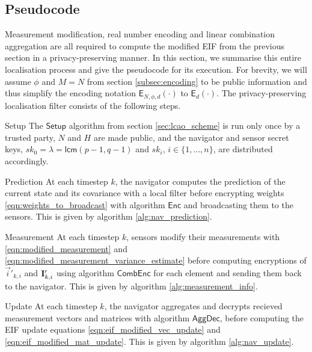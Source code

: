 \documentclass[10pt,letterpaper,oneside,twocolumn,journal]{IEEEtran}
\theoremstyle{definition}
\theoremstyle{definition}
\theoremstyle{remark}
\begin{document}
% 
% 

\subsection{Pseudocode} \label{subsec:pseudocode}
Measurement modification, real number encoding and linear combination aggregation are all required to compute the modified EIF from the previous section in a privacy-preserving manner. In this section, we summarise this entire localisation process and give the pseudocode for its execution. For brevity, we will assume $\phi$ and $M=N$ from section \ref{subsec:encoding} to be public information and thus simplify the encoding notation $\mathsf{E}_{N,\phi,d}(\cdot)$ to $\mathsf{E}_{d}(\cdot)$. The privacy-preserving localisation filter consists of the following steps.
\begin{LaTeXdescription}
    \item[Setup] The $\mathsf{Setup}$ algorithm from section \ref{sec:lcao_scheme} is run only once by a trusted party, $N$ and $H$ are made public, and the navigator and sensor secret keys, $sk_0=\lambda=\mathsf{lcm}(p-1, q-1)$ and $sk_i$, $i\in\{1,\dots,n\}$, are distributed accordingly. 

    \item[Prediction] At each timestep $k$, the navigator computes the prediction of the current state and its covariance with a local filter before encrypting weights \eqref{eqn:weights_to_broadcast} with algorithm $\mathsf{Enc}$ and broadcasting them to the sensors. This is given by algorithm \ref{alg:nav_prediction}.

    \item[Measurement] At each timestep $k$, sensors modify their measurements with \eqref{eqn:modified_measurement} and \eqref{eqn:modified_measurement_variance_estimate} before computing encryptions of $\vec{i}'_{k,i}$ and ${{\mathbf{I}}}'_{k,i}$ using algorithm $\mathsf{CombEnc}$ for each element and sending them back to the navigator. This is given by algorithm \ref{alg:measurement_info}.

    \item[Update] At each timestep $k$, the navigator aggregates and decrypts recieved measurement vectors and matrices with algorithm $\mathsf{AggDec}$, before computing the EIF update equations \eqref{eqn:eif_modified_vec_update} and \eqref{eqn:eif_modified_mat_update}. This is given by algorithm \ref{alg:nav_update}.
\end{LaTeXdescription}
\end{document}

